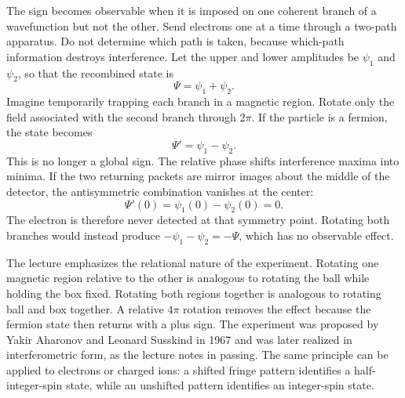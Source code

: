 The sign becomes observable when it is imposed on one coherent branch of a wavefunction but not the other. Send electrons one at a time through a two-path apparatus. Do not determine which path is taken, because which-path information destroys interference. Let the upper and lower amplitudes be \(\psi_1\) and \(\psi_2\), so that the recombined state is
\begin{equation}
\Psi=\psi_1+\psi_2.
\end{equation}
Imagine temporarily trapping each branch in a magnetic region. Rotate only the field associated with the second branch through \(2\pi\). If the particle is a fermion, the state becomes
\begin{equation}
\Psi'=\psi_1-\psi_2.
\end{equation}
This is no longer a global sign. The relative phase shifts interference maxima into minima. If the two returning packets are mirror images about the middle of the detector, the antisymmetric combination vanishes at the center:
\begin{equation}
\Psi'(0)=\psi_1(0)-\psi_2(0)=0.
\end{equation}
The electron is therefore never detected at that symmetry point. Rotating both branches would instead produce \(-\psi_1-\psi_2=-\Psi\), which has no observable effect.

The lecture emphasizes the relational nature of the experiment. Rotating one magnetic region relative to the other is analogous to rotating the ball while holding the box fixed. Rotating both regions together is analogous to rotating ball and box together. A relative \(4\pi\) rotation removes the effect because the fermion state then returns with a plus sign. The experiment was proposed by Yakir Aharonov and Leonard Susskind in 1967 and was later realized in interferometric form, as the lecture notes in passing. The same principle can be applied to electrons or charged ions: a shifted fringe pattern identifies a half-integer-spin state, while an unshifted pattern identifies an integer-spin state.

\begin{classroomqa}
\end{classroomqa}

\begin{classroomqa}
\end{classroomqa}

